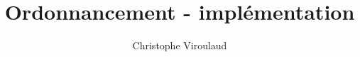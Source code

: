 \documentclass[svgnames,11pt]{beamer}
\author[]{Christophe Viroulaud}
\title{Ordonnancement - implémentation}
\date{\framebox{\textbf{Archi 05}}}
\institute{Terminale - NSI}
\begin{document}
\begin{frame}
\titlepage
\end{frame}
\end{document}
